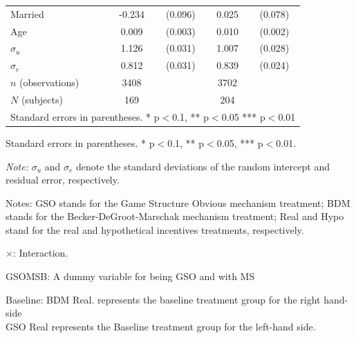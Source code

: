 \documentclass[12pt]{article}
\newcommand{\sym}[1]{\rlap{$^{#1}$}}
\begin{document}
\begin{table}[H]
{\begin{tabular}{l*{2}{cc}}
Married     &      -0.234\sym{**} &     (0.096)&       0.025         &     (0.078)\\
Age         &       0.009\sym{***}&     (0.003)&       0.010\sym{***}&     (0.002)\\
$\sigma_u$     &       1.126\sym{***}&     (0.031)&       1.007\sym{***}&     (0.028)\\
$\sigma_e$     &       0.812\sym{***}&     (0.031)&       0.839\sym{***}&     (0.024)\\
\hline
\(n\) (observations)      &        3408         &            &        3702         &            \\
\(N\) (subjects)      &        169         &            &        204         &            \\
\hline \hline
\multicolumn{5}{l}{\footnotesize Standard errors in parentheses. * p$<$0.1, ** p$<$0.05 *** p$<$0.01}\\
\end{tabular}
}



\begin{tablenotes}
            \footnotesize
            \item Standard errors in parentheses. * p$<$0.1, ** p$<$0.05, *** p$<$0.01.
            \item \textit{Note:} $\sigma_u$ and $\sigma_e$ denote the standard deviations of the random intercept and residual error, respectively.
            \item Notes: GSO stands for the Game Structure Obvious mechanism treatment; BDM stands for the Becker-DeGroot-Marschak mechanism treatment; Real and Hypo stand for the real and hypothetical incentives treatments, respectively.
           \item $\times$: Interaction.
           \item GSOMSB: A dummy variable for being GSO and with MS
           \item Baseline: BDM Real. represents the baseline treatment group for the right hand-side \\
           GSO Real represents the Baseline treatment group for the left-hand side.
        \end{tablenotes}
\end{table}




\clearpage
\end{document}
